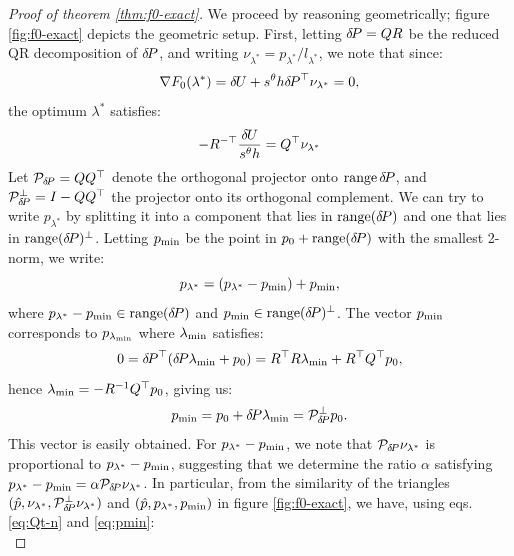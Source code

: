 \documentclass[smallcondensed]{svjour3}
\begin{document}
\begin{proof}[Proof of theorem \ref{thm:f0-exact}]
  We proceed by reasoning geometrically; figure \ref{fig:f0-exact}
  depicts the geometric setup. First, letting ${\delta \hspace{-0.14em} P} = QR$ be the
  reduced QR decomposition of ${\delta \hspace{-0.14em} P}$, and writing
  $\nu_{\lambda^*} = p_{\lambda^*}/l_{\lambda^*}$, we note that since:
  \begin{equation}
    \nabla F_0(\lambda^*) = {\delta \hspace{-0.09em} U} + s^\theta h {\delta \hspace{-0.14em} P}^\top \nu_{\lambda^*} = 0,
  \end{equation}
  the optimum $\lambda^*$ satisfies:
  \begin{equation}\label{eq:Qt-n}
    - R^{-\top} \frac{{\delta \hspace{-0.09em} U}}{s^\theta h} = Q^\top \nu_{\lambda^*}
  \end{equation}
  Let $\mathcal{P}_{{\delta \hspace{-0.14em} P}} = QQ^\top$ denote the orthogonal
  projector onto $\operatorname{range} {\delta \hspace{-0.14em} P}$, and
  $\mathcal{P}^\perp_{{\delta \hspace{-0.14em} P}} = I - QQ^\top$ the projector onto its
  orthogonal complement. We can try to write $p_{\lambda^*}$ by
  splitting it into a component that lies in $\operatorname{range}({\delta \hspace{-0.14em} P})$ and
  one that lies in $\operatorname{range}({\delta \hspace{-0.14em} P})^\perp$. Letting $p_{\operatorname{min}}$ be the
  point in $p_0 + \operatorname{range}({\delta \hspace{-0.14em} P})$ with the smallest 2-norm, we
  write:
  \begin{equation}\label{eq:plam-decomp}
    p_{\lambda^*} = (p_{\lambda^*} - p_{\operatorname{min}}) + p_{\operatorname{min}},
  \end{equation}
  where $p_{\lambda^*} - p_{\operatorname{min}} \in \operatorname{range}({\delta \hspace{-0.14em} P})$ and
  $p_{\operatorname{min}} \in \operatorname{range}({\delta \hspace{-0.14em} P})^\perp$. The vector $p_{\operatorname{min}}$ corresponds to
  $p_{\lambda_{\operatorname{min}}}$ where $\lambda_{\operatorname{min}}$ satisfies:
  \begin{equation}
    0 = {\delta \hspace{-0.14em} P}^\top ({\delta \hspace{-0.14em} P} \lambda_{\operatorname{min}} + p_0) = R^\top R \lambda_{\operatorname{min}} + R^\top Q^\top p_0,
  \end{equation}
  hence $\lambda_{\operatorname{min}} = -R^{-1} Q^\top p_0$, giving us:
  \begin{equation}\label{eq:pmin}
    p_{\operatorname{min}} = p_0 + {\delta \hspace{-0.14em} P} \lambda_{\operatorname{min}} = \mathcal{P}^\perp_{{\delta \hspace{-0.14em} P}} p_0.
  \end{equation}
  This vector is easily obtained. For $p_{\lambda^*} - p_{\operatorname{min}}$, we note
  that $\mathcal{P}_{{\delta \hspace{-0.14em} P}} \nu_{\lambda^*}$ is proportional to
  $p_{\lambda^*} - p_{\operatorname{min}}$, suggesting that we determine the ratio
  $\alpha$ satisfying
  $p_{\lambda^*} - p_{\operatorname{min}} = \alpha \mathcal{P}_{{\delta \hspace{-0.14em} P}}
  \nu_{\lambda^*}$. In particular, from the similarity of the
  triangles
  $(\hat{p}, \nu_{\lambda^*}, \mathcal{P}^\perp_{{\delta \hspace{-0.14em} P}}
  \nu_{\lambda^*})$ and $(\hat{p}, p_{\lambda^*}, p_{\operatorname{min}})$ in figure
  \ref{fig:f0-exact}, we have, using eqs.\@ \ref{eq:Qt-n} and
  \ref{eq:pmin}:
  \begin{equation}\label{eq:alpha-solve}

\end{equation}
\end{proof}
\end{document}

